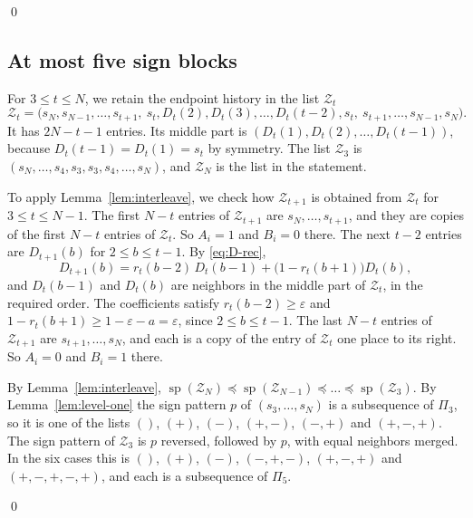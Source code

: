 \qed

\subsection{At most five sign blocks}\label{app:signs-five}

For $3\le t\le N$, we retain the endpoint history in the list $\mathcal Z_t$
\[
 \mathcal Z_t=\bigl(s_N,s_{N-1},\dots,s_{t+1},\ s_t,D_t(2),D_t(3),\dots,D_t(t-2),s_t,\
 s_{t+1},\dots,s_{N-1},s_N\bigr).
\]
It has $2N-t-1$ entries. Its middle part is
$(D_t(1),D_t(2),\dots,D_t(t-1))$, because $D_t(t-1)=D_t(1)=s_t$ by symmetry.
The list $\mathcal Z_3$ is $(s_N,\dots,s_4,s_3,s_3,s_4,\dots,s_N)$, and $\mathcal Z_N$ is the
list in the statement.

To apply Lemma~\ref{lem:interleave}, we check how
$\mathcal Z_{t+1}$ is obtained from $\mathcal Z_t$ for $3\le t\le N-1$. The first $N-t$ entries of
$\mathcal Z_{t+1}$ are $s_N,\dots,s_{t+1}$, and they are copies of the first $N-t$
entries of $\mathcal Z_t$. So $A_i=1$ and $B_i=0$ there. The next $t-2$ entries are
$D_{t+1}(b)$ for $2\le b\le t-1$. By \eqref{eq:D-rec},
\[
 D_{t+1}(b)=r_t(b-2)\,D_t(b-1)+\bigl(1-r_t(b+1)\bigr)D_t(b),
\]
and $D_t(b-1)$ and $D_t(b)$ are neighbors in the middle part of $\mathcal Z_t$, in the
required order. The coefficients satisfy $r_t(b-2)\ge\varepsilon$ and
$1-r_t(b+1)\ge1-\varepsilon-a=\varepsilon$, since $2\le b\le t-1$. The last
$N-t$ entries of $\mathcal Z_{t+1}$ are $s_{t+1},\dots,s_N$, and each is a copy of the
entry of $\mathcal Z_t$ one place to its right. So $A_i=0$ and $B_i=1$ there.

By Lemma~\ref{lem:interleave},
$\operatorname{sp}(\mathcal Z_N)\preceq\operatorname{sp}(\mathcal Z_{N-1})\preceq\dots\preceq\operatorname{sp}(\mathcal Z_3)$.
By Lemma~\ref{lem:level-one} the sign pattern $p$ of $(s_3,\dots,s_N)$ is a
subsequence of $\Pi_3$, so it is one of the lists $()$, $(+)$, $(-)$, $(+,-)$,
$(-,+)$ and $(+,-,+)$. The sign pattern of $\mathcal Z_3$ is $p$ reversed, followed by
$p$, with equal neighbors merged. In the six cases this is $()$, $(+)$, $(-)$,
$(-,+,-)$, $(+,-,+)$ and $(+,-,+,-,+)$, and each is a subsequence of $\Pi_5$.

\qed
